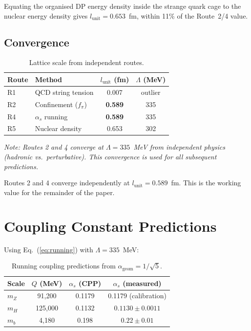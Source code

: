 \documentclass[12pt,a4paper]{article}
\begin{document}
Equating the organised DP energy density inside the strange quark cage to the nuclear energy density gives $l_{\mathrm{unit}} = 0.653$~fm, within 11\% of the Route~2/4 value.

\subsection{Convergence}

\begin{table}[h]
\centering
\caption{Lattice scale from independent routes.}
\label{tab:routes}
\begin{tabular}{llcc}
\toprule
Route & Method & $l_{\mathrm{unit}}$ (fm) & $\Lambda$ (MeV) \\
\midrule
R1 & QCD string tension & 0.007 & outlier \\
R2 & Confinement ($f_\pi$) & \textbf{0.589} & 335 \\
R4 & $\alpha_s$ running & \textbf{0.589} & 335 \\
R5 & Nuclear density & 0.653 & 302 \\
\bottomrule
\end{tabular}
\smallskip
\noindent\textit{Note: Routes 2 and 4 converge at $\Lambda = 335$~MeV from independent physics (hadronic vs.\ perturbative). This convergence is used for all subsequent predictions.}
\end{table}

Routes 2 and 4 converge independently at $l_{\mathrm{unit}} = 0.589$~fm. This is the working value for the remainder of the paper.

\section{Coupling Constant Predictions}

Using Eq.~(\ref{eq:running}) with $\Lambda = 335$~MeV:

\begin{table}[h]
\centering
\caption{Running coupling predictions from $\alpha_{\mathrm{geom}} = 1/\sqrt{5}$.}
\label{tab:alphas}
\begin{tabular}{lccc}
\toprule
Scale & $Q$ (MeV) & $\alpha_s$ (CPP) & $\alpha_s$ (measured) \\
\midrule
$m_Z$ & 91,200 & 0.1179 & 0.1179 (calibration) \\
$m_H$ & 125,000 & 0.1132 & $0.1130 \pm 0.0011$ \\
$m_b$ & 4,180 & 0.198 & $0.22 \pm 0.01$ \\
\bottomrule
\end{tabular}
\end{table}
\end{document}
